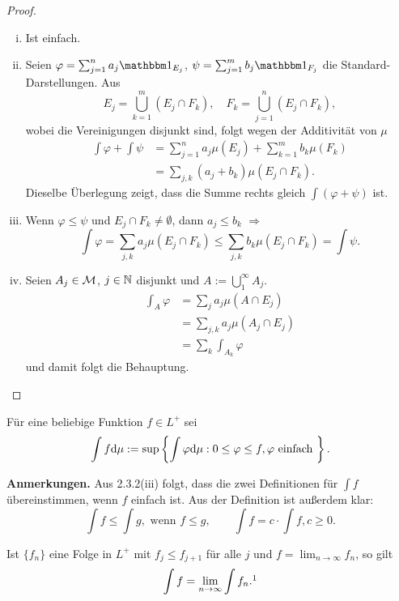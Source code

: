 \begin{proof}
 \begin{enumerate}[(i)]
  \item Ist einfach.
  \item Seien $\varphi = \sum_{j=1}^n a_j \ind_{E_j}$, $\psi = \sum_{j=1}^m b_j \ind_{F_j}$ die Standard-Darstellungen. Aus 
  \[ E_j = \bigcup_{k=1}^m ( E_j \cap F_k ), \quad F_k = \bigcup_{j=1}^n ( E_j \cap F_k ), \]
  wobei die Vereinigungen disjunkt sind, folgt wegen der Additivität von $\mu$ 
  \[ \begin{aligned}
      \int \varphi + \int \psi &= \sum_{j=1}^n a_j \mu( E_j ) + \sum_{k=1}^m b_k \mu( F_k ) \\
      &= \sum_{j,k} (a_j + b_k) \mu (E_j \cap F_k ).
     \end{aligned} \]
  Dieselbe Überlegung zeigt, dass die Summe rechts gleich $\int(\varphi + \psi)$ ist.
  \item Wenn $\varphi \le \psi$ und $E_j \cap F_k \ne \emptyset$, dann $a_j \le b_k$ $\Rightarrow$
  \[ \int \varphi = \sum_{j,k} a_j \mu( E_j \cap F_k ) \le \sum_{j,k} b_k \mu (E_j \cap F_k) = \int \psi. \]
  \item Seien $A_j \in \mathcal{M}$, $j \in \mathbb{N}$ disjunkt und $A := \bigcup_1^\infty A_j$.
  \[ \begin{aligned}
      \int_A \varphi &= \sum_j a_j \mu( A \cap E_j ) \\
      &= \sum_{j,k} a_j \mu ( A_j \cap E_j ) \\
      &= \sum_k \int_{A_k} \varphi
     \end{aligned} \]
  und damit folgt die Behauptung. \qedhere
 \end{enumerate}
\end{proof}

\begin{defn}
 Für eine beliebige Funktion $f \in L^+$ sei
 \[ \int f \mathrm{d} \mu := \sup \left\{ \int \varphi \mathrm{d} \mu : 0 \le \varphi \le f, \varphi \text{ einfach } \right\}. \]
\end{defn}

\textbf{Anmerkungen.} 
Aus 2.3.2(iii) folgt, dass die zwei Definitionen für $\int f$ übereinstimmen, wenn $f$ einfach ist. Aus der Definition ist außerdem klar:
\[ \int f \le \int g, \text{ wenn } f \le g, \qquad \int f = c \cdot \int f, c \ge 0. \]

\begin{thm}
 Ist $\{f_n\}$ eine Folge in $L^+$ mit $f_j \le f_{j+1}$ für alle $j$ und $f = \lim_{n \to \infty} f_n$, so gilt
 \[ \int f = \lim_{n \to \infty} \int f_n.\footnotemark \]
\end{thm}

